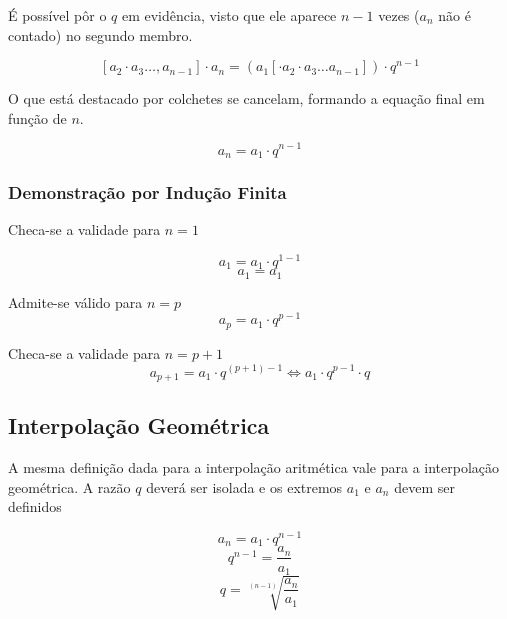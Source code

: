 \documentclass[11pt]{article}
\begin{document}
É possível pôr o $q$ em evidência, visto que ele aparece $n - 1$ vezes ($a_{n}$ não é contado) no segundo membro.

\[[a_{2} \cdot a_{3}\dots, a_{n - 1}]\cdot a_{n} = (a_1 [\cdot a_2 \cdot a_3 \dots a_{n - 1}])\cdot q^{n - 1}\]

O que está destacado por colchetes se cancelam, formando a equação final em função de $n$.


\begin{tcolorbox}[colback=LightYellow]
\[a_{n} = a_1\cdot q^{n - 1}\]
\end{tcolorbox}

\subsubsection{Demonstração por Indução Finita}

\begin{itemize}
\begin{tcolorbox}[colback=LightYellow]
\item Checa-se a validade para $n = 1$

\[a_{1} = a_{1}\cdot q^{1-1}\]
\[a_{1} = a_{1}\]
\end{tcolorbox}

\begin{tcolorbox}[colback=LightYellow]
\item Admite-se válido para $n = p$
      \[a_{p} = a_{1}\cdot q^{p - 1}\]
\end{tcolorbox}

\begin{tcolorbox}[colback=LightYellow]
\item Checa-se a validade para $n = p + 1$
      \[a_{p + 1} = a_{1}\cdot q^{(p + 1) - 1} \Leftrightarrow a_{1}\cdot q^{p-1}\cdot q\]
\end{tcolorbox}
\end{itemize}

\subsection{Interpolação Geométrica}

A mesma definição dada para a interpolação aritmética vale para a interpolação geométrica. A razão $q$ deverá ser isolada e os extremos $a_{1}$ e $a_{n}$ devem ser definidos

\begin{tcolorbox}[colback=LightYellow]
\[a_{n} = a_{1}\cdot q^{n - 1}\]
\[q^{n - 1} = \frac{a_{n}}{a_{1}}\]
\[q = \sqrt[(n - 1)]{\frac{a_{n}}{a_{1}}}\]
\end{tcolorbox}
\end{document}
